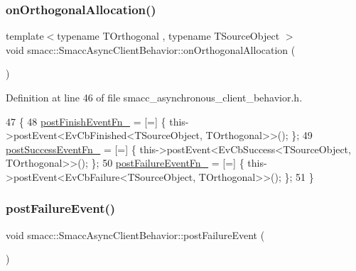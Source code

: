 \subsubsection{\texorpdfstring{on\+Orthogonal\+Allocation()}{onOrthogonalAllocation()}}
{\footnotesize\ttfamily template$<$typename T\+Orthogonal , typename T\+Source\+Object $>$ \\
void smacc\+::\+Smacc\+Async\+Client\+Behavior\+::on\+Orthogonal\+Allocation (\begin{DoxyParamCaption}{ }\end{DoxyParamCaption})\hspace{0.3cm}{\ttfamily [inline]}}



Definition at line 46 of file smacc\+\_\+asynchronous\+\_\+client\+\_\+behavior.\+h.


\begin{DoxyCode}
47         \{
48             \hyperlink{classsmacc_1_1SmaccAsyncClientBehavior_af7a9ee952ba3fb8629aa55491606a7b2}{postFinishEventFn\_} = [=] \{ this->postEvent<EvCbFinished<TSourceObject,
       TOrthogonal>>(); \};
49             \hyperlink{classsmacc_1_1SmaccAsyncClientBehavior_a944ed10880796d53649bee39dc1299c0}{postSuccessEventFn\_} = [=] \{ this->postEvent<EvCbSuccess<TSourceObject,
       TOrthogonal>>(); \};
50             \hyperlink{classsmacc_1_1SmaccAsyncClientBehavior_a8041c43a0381f18fae6470a98eb9273d}{postFailureEventFn\_} = [=] \{ this->postEvent<EvCbFailure<TSourceObject,
       TOrthogonal>>(); \};
51         \}
\end{DoxyCode}
\mbox{\label{classsmacc_1_1SmaccAsyncClientBehavior_af6fa358cb1ab5ed16791a201f59260e0}} 
\subsubsection{\texorpdfstring{post\+Failure\+Event()}{postFailureEvent()}}
{\footnotesize\ttfamily void smacc\+::\+Smacc\+Async\+Client\+Behavior\+::post\+Failure\+Event (\begin{DoxyParamCaption}{ }\end{DoxyParamCaption})\hspace{0.3cm}{\ttfamily [protected]}}



